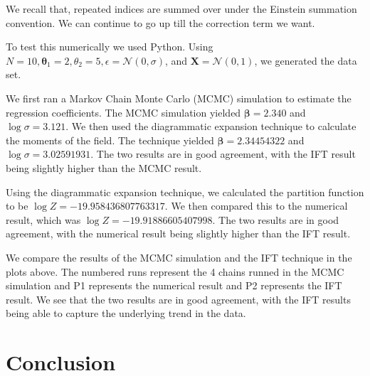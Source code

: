 \documentclass[letterpaper,12pt]{article}
\begin{document}
We recall that, repeated indices are summed over under the Einstein summation convention. 
We can continue to go up till the correction term we want.

\vspace*{0.5cm}
To test this numerically we used Python. 
Using $N = 10, \bm{\theta}_{1} = 2, \theta_{2} = 5, \epsilon = \mathcal{N}(0, \sigma)$, and $\bm{X} = \mathcal{N}(0, 1)$, we generated the data set.


\vspace*{0.5cm}
We first ran a Markov Chain Monte Carlo (MCMC) simulation to estimate the regression coefficients.
The MCMC simulation yielded $\bm{\beta} = 2.340$ and $\log \sigma = 3.121$.
We then used the diagrammatic expansion technique to calculate the moments of the field.
The technique yielded $\bm{\beta} = 2.34454322$ and $\log \sigma = 3.02591931$.
The two results are in good agreement, with the IFT result being slightly higher than the MCMC result.


\vspace*{0.5cm}
Using the diagrammatic expansion technique, we calculated the partition function to be $\log Z = -19.958436807763317$.
We then compared this to the numerical result, which was $\log Z = -19.91886605407998$.
The two results are in good agreement, with the numerical result being slightly higher than the IFT result.


We compare the results of the MCMC simulation and the IFT technique in the plots above.
The numbered runs represent the 4 chains runned in the MCMC simulation and P1 represents the numerical result and P2 represents the IFT result.
We see that the two results are in good agreement, with the IFT results being able to capture the underlying trend in the data.

\section{Conclusion}
\end{document}
